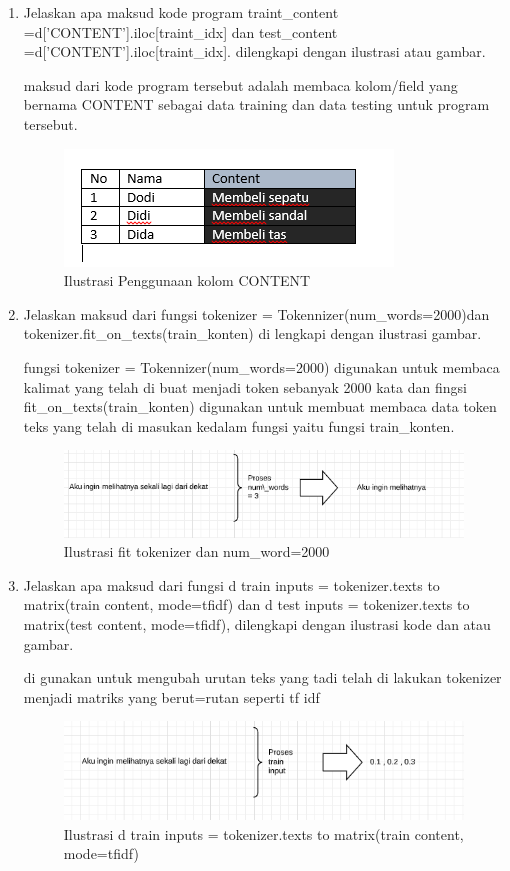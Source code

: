 \begin{enumerate}
\item Jelaskan apa maksud kode program traint\_content =d['CONTENT'].iloc[traint\_idx] dan test\_content =d['CONTENT'].iloc[traint\_idx]. dilengkapi dengan ilustrasi atau gambar.\par
maksud dari kode program tersebut adalah membaca kolom/field yang bernama CONTENT sebagai data training dan data testing untuk program tersebut.
\begin{figure}[ht]
\centering
\includegraphics[scale=0.4]{figures/1174002/chapter7/4.PNG}
\caption{Ilustrasi Penggunaan kolom CONTENT}
\label{Contoh}
\end{figure}


\item Jelaskan maksud dari fungsi tokenizer = Tokennizer(num\_words=2000)dan tokenizer.fit\_on\_texts(train\_konten) di lengkapi dengan ilustrasi gambar.\par
fungsi tokenizer = Tokennizer(num\_words=2000) digunakan untuk membaca kalimat yang telah di buat menjadi token sebanyak 2000 kata dan fingsi fit\_on\_texts(train\_konten) digunakan untuk membuat membaca data token teks yang telah di masukan kedalam fungsi yaitu fungsi train\_konten.
\begin{figure}[ht]
\centering
\includegraphics[scale=0.4]{figures/1174002/chapter7/5.PNG}
\caption{Ilustrasi fit tokenizer dan num\_word=2000}
\label{Contoh}
\end{figure}


\item Jelaskan apa maksud dari fungsi d train inputs = tokenizer.texts to matrix(train content, mode=tfidf) dan d test inputs = tokenizer.texts to matrix(test content, mode=tfidf), dilengkapi dengan ilustrasi kode dan atau gambar.\par 
di gunakan untuk mengubah urutan teks yang tadi telah di lakukan tokenizer menjadi matriks yang berut=rutan seperti tf idf 
\begin{figure}[ht]
\centering
\includegraphics[scale=0.4]{figures/1174002/chapter7/6.PNG}
\caption{Ilustrasi d train inputs = tokenizer.texts to matrix(train content, mode=tfidf)}
\label{Contoh}
\end{figure}



\end{enumerate}
